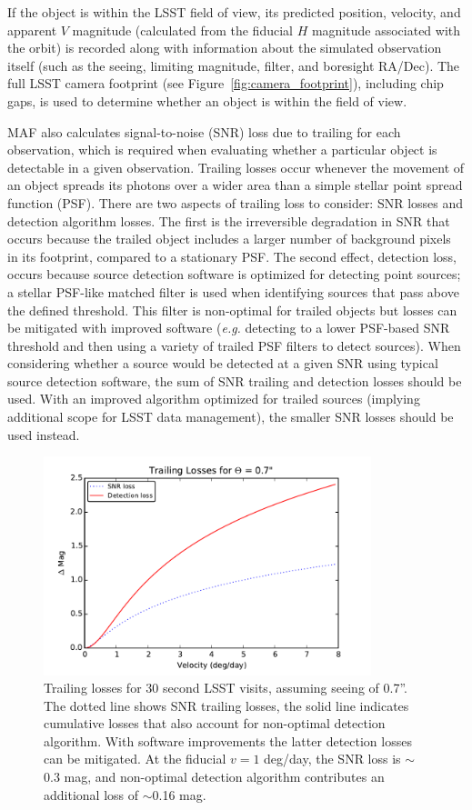 If the object is within the LSST field of view, its predicted position, velocity, and apparent $V$ magnitude (calculated from the fiducial $H$ magnitude associated with the orbit) is recorded along with information about the simulated observation itself (such as the seeing, limiting magnitude, filter, and boresight RA/Dec). The full LSST camera footprint (see Figure~\ref{fig:camera_footprint}), including chip gaps, is
used to determine whether an object is within the field of view.

MAF also calculates signal-to-noise (SNR) loss due to trailing for each observation, which is required when evaluating whether
a particular object is detectable in a given observation. Trailing losses occur whenever the movement of an object spreads its photons over a wider area than a simple stellar point spread function (PSF). There are two aspects of trailing loss to consider: SNR losses and detection algorithm losses. The first is the
irreversible degradation in SNR that occurs because the trailed object includes a larger number of background pixels in its footprint, compared to a stationary PSF. The second effect, detection loss, occurs because source detection software is optimized for detecting point sources; a stellar PSF-like matched filter is used when identifying sources that pass above the defined threshold. This filter is non-optimal for trailed objects but losses can be mitigated with improved software ({\it e.g.} detecting to a lower PSF-based SNR threshold and then using a variety of trailed PSF filters to detect sources). When considering whether a source would be detected at a given SNR using typical source detection software, the sum of SNR trailing and detection losses should be used. With an improved
algorithm optimized for trailed sources (implying additional scope for LSST data management), the smaller SNR losses should be
used instead.

\begin{figure}[t!]
\centering
\includegraphics[width=0.85\textwidth]{figures/trailing_losses}
\caption{Trailing losses for 30 second LSST visits, assuming seeing of
  0.7''. The dotted line shows SNR trailing losses, the solid line
  indicates cumulative losses that also account for non-optimal detection
  algorithm. With software improvements the latter detection losses can be
  mitigated. At the fiducial $v=1$ deg/day, the SNR loss is $\sim$0.3 mag,
  and non-optimal detection algorithm contributes an additional loss of
  $\sim$0.16 mag.
\label{fig:trailinglosses}}
\end{figure}

